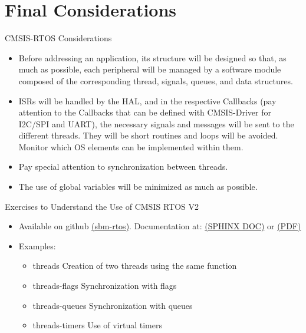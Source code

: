 \section{Final Considerations}
\begin{frame}{CMSIS-RTOS Considerations}
\begin{itemize}
    \item Before addressing an application, its structure will be designed so that, as much as possible, each peripheral will be managed by a software module composed of the corresponding thread, signals, queues, and data structures.
    \item ISRs will be handled by the HAL, and in the respective Callbacks (pay attention to the Callbacks that can be defined with CMSIS-Driver for I2C/SPI and UART), the necessary signals and messages will be sent to the different threads. They will be short routines and loops will be avoided. Monitor which OS elements can be implemented within them.
    \item Pay special attention to synchronization between threads.
    \item The use of global variables will be minimized as much as possible.
\end{itemize}

\end{frame}
\begin{frame}{Exercises to Understand the Use of CMSIS RTOS V2}
    \begin{itemize}
        \item Available on github \href{https://github.com/mruizlgz/SBM-rtos}{(sbm-rtos)}. Documentation at: \href{https://mruizglz.github.io/SBM-rtos}{(SPHINX DOC)} or \href{https://mruizglz.github.io/SBM-rtos/simplepdf/SBM-CMSIS-RTOS-V2.pdf}{(PDF)}

        \item Examples:
            \begin{itemize}
                \item threads Creation of two threads using the same function
                \item threads-flags Synchronization with flags
                \item threads-queues Synchronization with queues
                \item threads-timers Use of virtual timers
            \end{itemize}
    \end{itemize}
\end{frame}
